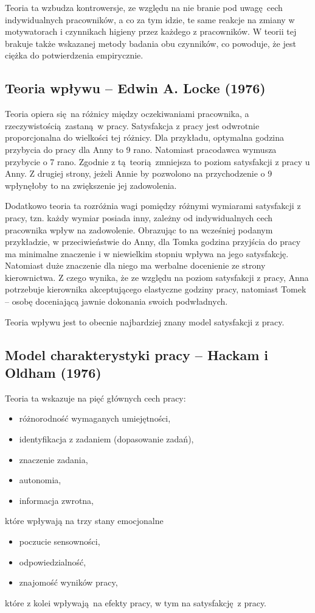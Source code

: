 Teoria ta wzbudza kontrowersje, ze względu na nie branie pod uwagę cech indywidualnych pracowników, a co za tym idzie, te same reakcje na zmiany w motywatorach i czynnikach higieny przez każdego z pracowników. W teorii tej brakuje także wskazanej metody badania obu czynników, co powoduje, że jest ciężka do potwierdzenia empirycznie.


\subsection{Teoria wpływu -- Edwin A. Locke (1976)}
\label{sec:theory-sat-locke}

Teoria \cite{locke1976nature} opiera się na różnicy między oczekiwaniami pracownika, a rzeczywistością zastaną w pracy. Satysfakcja z pracy jest odwrotnie proporcjonalna do wielkości tej różnicy. Dla przykładu, optymalna godzina przybycia do pracy dla Anny to 9 rano. Natomiast pracodawca wymusza przybycie o 7 rano. Zgodnie z tą teorią zmniejsza to poziom satysfakcji z pracy u Anny. Z drugiej strony, jeżeli Annie by pozwolono na przychodzenie o 9 wpłynęłoby to na zwiększenie jej zadowolenia.

Dodatkowo teoria ta rozróżnia wagi pomiędzy różnymi wymiarami satysfakcji z pracy, tzn. każdy wymiar posiada inny, zależny od indywidualnych cech pracownika wpływ na zadowolenie. Obrazując to na wcześniej podanym przykładzie, w przeciwieństwie do Anny, dla Tomka godzina przyjścia do pracy ma minimalne znaczenie i w niewielkim stopniu wpływa na jego satysfakcję. Natomiast duże znaczenie dla niego ma werbalne docenienie ze strony kierownictwa. Z czego
wynika, że ze względu na poziom satysfakcji z pracy, Anna potrzebuje kierownika akceptującego elastyczne godziny pracy, natomiast Tomek -- osobę doceniającą jawnie dokonania swoich podwładnych.

Teoria wpływu jest to obecnie najbardziej znany model satysfakcji z pracy.

\subsection{Model charakterystyki pracy -- Hackam i Oldham (1976)}
Teoria ta \cite{hackman1976motivation} wskazuje na pięć głównych cech pracy:
\begin{itemize}
\item różnorodność wymaganych umiejętności,
\item identyfikacja z zadaniem (dopasowanie zadań),
\item znaczenie zadania,
\item autonomia,
\item informacja zwrotna,
\end{itemize}
które wpływają na trzy stany emocjonalne
\begin{itemize}
\item poczucie sensowności,
\item odpowiedzialność,
\item znajomość wyników pracy,
\end{itemize}
które z kolei wpływają na efekty pracy, w tym na satysfakcję z pracy. 

